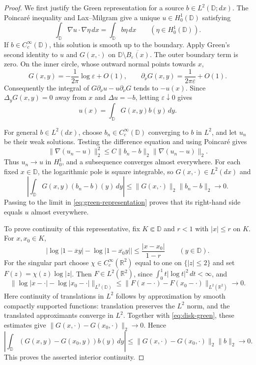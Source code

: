 \begin{proof}
We first justify the Green representation for a source
$b\in L^2(\mathbb D;dx)$. The Poincar\'e inequality and Lax--Milgram
\cite[Theorem 4.20, p.~103]{Hunter}
give a unique $u\in H_0^1(\mathbb D)$ satisfying
\begin{equation}\label{eq:weak-poisson}
 \int_{\mathbb D}\nabla u\cdot\nabla\eta\,dx
 =\int_{\mathbb D}b\eta\,dx
 \qquad(\eta\in H_0^1(\mathbb D)).
\end{equation}
If $b\in C_c^\infty(\mathbb D)$, this solution is smooth up to the
boundary. Apply Green's second identity to $u$ and $G(x,\cdot)$ on
$\mathbb D\setminus\overline{B_\varepsilon(x)}$.
The outer boundary term is zero. On the inner circle, whose outward
normal points towards $x$,
\[
 G(x,y)=-\frac1{2\pi}\log\varepsilon+O(1),
 \qquad \partial_\nu G(x,y)=\frac1{2\pi\varepsilon}+O(1).
\]
Consequently the integral of
$G\partial_\nu u-u\partial_\nu G$ tends to $-u(x)$.
Since $\Delta_yG(x,y)=0$ away from $x$ and $\Delta u=-b$,
letting $\varepsilon\downarrow0$ gives
\begin{equation}\label{eq:green-representation}
 u(x)=\int_{\mathbb D}G(x,y)b(y)\,dy.
\end{equation}

For general $b\in L^2(dx)$, choose $b_n\in C_c^\infty(\mathbb D)$
converging to $b$ in $L^2$, and let $u_n$ be their weak solutions.
Testing the difference equation and using Poincar\'e gives
\[
 \|\nabla(u_n-u)\|_2^2
 \le C\|b_n-b\|_2\|\nabla(u_n-u)\|_2.
\]
Thus $u_n\to u$ in $H_0^1$, and a subsequence converges almost
everywhere. For each fixed $x\in\mathbb D$, the logarithmic pole is
square integrable, so $G(x,\cdot)\in L^2(dx)$ and
\[
 \left|\int_{\mathbb D}G(x,y)(b_n-b)(y)\,dy\right|
 \le\|G(x,\cdot)\|_2\|b_n-b\|_2\longrightarrow0.
\]
Passing to the limit in \cref{eq:green-representation} proves that
its right-hand side equals $u$ almost everywhere.

To prove continuity of this representative, fix $K\Subset\mathbb D$
and $r<1$ with $|x|\le r$ on $K$. For $x,x_0\in K$,
\[
 \left|\log|1-\overline{x}y|
           -\log|1-\overline{x_0}y|\right|
 \le\frac{|x-x_0|}{1-r}\qquad(y\in\mathbb D).
\]
For the singular part choose $\chi\in C_c^\infty(\mathbb R^2)$
equal to one on $\{|z|\le2\}$ and set $F(z)=\chi(z)\log|z|$.
Then $F\in L^2(\mathbb R^2)$, since
$\int_0^1 t|\log t|^2\,dt<\infty$, and
\[
 \|\log|x-\cdot|-\log|x_0-\cdot|\|_{L^2(\mathbb D)}
 \le\|F(x-\cdot)-F(x_0-\cdot)\|_{L^2(\mathbb R^2)}
 \longrightarrow0.
\]
Here continuity of translations in $L^2$ follows by approximation
by smooth compactly supported functions: translation preserves the
$L^2$ norm, and the translated approximants converge in $L^2$.
Together with \cref{eq:disk-green}, these estimates give
$\|G(x,\cdot)-G(x_0,\cdot)\|_2\to0$. Hence
\[
 \left|\int_{\mathbb D}(G(x,y)-G(x_0,y))b(y)\,dy\right|
 \le\|G(x,\cdot)-G(x_0,\cdot)\|_2\|b\|_2\longrightarrow0.
\]
This proves the asserted interior continuity.


\end{proof}
